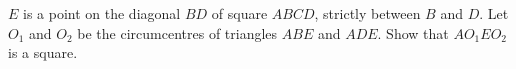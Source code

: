 $E$ is a point on the diagonal $BD$ of square $ABCD$, strictly between $B$ and $D$. Let $O_1$ and $O_2$ be the circumcentres of triangles $ABE$ and $ADE$. Show that $AO_1EO_2$ is a square.
